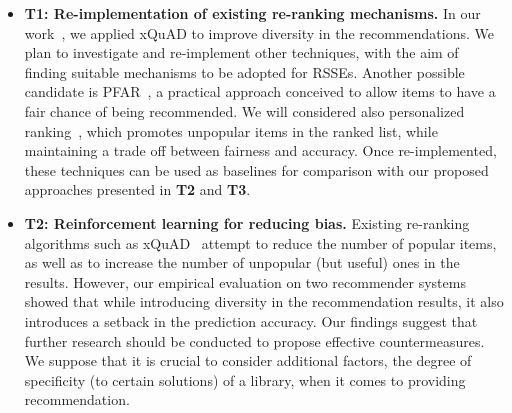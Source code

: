 \begin{itemize}
	\item \textbf{T1: Re-implementation of existing re-ranking mechanisms.} In our work~\cite{10174041}, we applied xQuAD \cite{10.1145/1772690.1772780} %
	to improve diversity in the recommendations. %
	We plan to investigate and re-implement other %
	techniques, with the aim of finding suitable mechanisms to be adopted for RSSEs. Another possible candidate is PFAR~\cite{DBLP:journals/corr/abs-1809-02921}, a practical approach conceived to allow items to have a fair chance of being recommended. We will considered also personalized ranking~\cite{DBLP:conf/flairs/AbdollahpouriBM19}, which promotes unpopular items in the ranked list, while maintaining a trade off between fairness and accuracy. Once re-implemented, these techniques can be used as baselines for comparison with our proposed approaches presented in \textbf{T2} and \textbf{T3}. %
	\item \textbf{T2: Reinforcement learning for reducing bias.} Existing re-ranking algorithms such as xQuAD~\cite{10.1145/1772690.1772780} %
	attempt to reduce the number of popular items, as well as to increase the number of unpopular (but useful) ones in the results. However, our empirical evaluation on two recommender systems showed that while introducing diversity in the recommendation results, it also introduces a setback in the prediction accuracy. Our findings suggest that %
	further research should be conducted to propose effective countermeasures. We suppose that it is crucial to consider %
	additional factors, \eg the degree of specificity (to certain solutions) of a library, when it comes to providing recommendation. %

\end{itemize}
